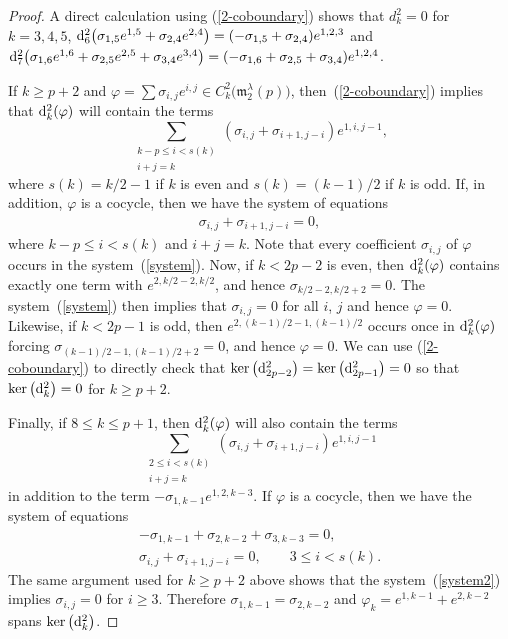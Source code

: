 \documentclass[10pt,a4paper]{amsart}
\def\phi{\varphi}
\def\m{\mathfrak m}
\numberwithin{equation}{section}
\begin{document}
\begin{proof} A direct calculation using (\ref{2-coboundary}) shows that $d^2_k=0$ for $k=3,4,5$, ${\rm d}^2_6\big(\sigma_{1,5}e^{1,5} +\sigma_{2,4}e^{2,4}\big)=(-\sigma_{1,5}+\sigma_{2,4})e^{1,2,3}$ and ${\rm d}^2_7\big(\sigma_{1,6}e^{1,6} +\sigma_{2,5}e^{2,5}+\sigma_{3,4}e^{3,4}\big) =(-\sigma_{1,6} +\sigma_{2,5} +\sigma_{3,4})e^{1,2,4}$.

If $k\ge p+2$ and $\phi=\sum \sigma_{i,j} e^{i,j}\in C^2_k\big(\m_2^\lambda(p)\big)$, then~(\ref{2-coboundary}) implies that ${\rm d}^2_k(\phi)$ will contain the
 terms
 \[\sum_{\substack{k-p\le i< s(k)\\ i+j=k}} (\sigma_{i,j}+\sigma_{i+1,j-i})e^{1,i,j-1},\] where $s(k)=k/2-1$
 if $k$ is even and $s(k)=(k-1)/2$ if $k$ is odd. If, in addition, $\phi$ is a cocycle, then we have the system of equations
 \begin{gather} \label{system}
 \sigma_{i,j}+\sigma_{i+1,j-i} = 0,
 \end{gather}
where $k-p\le i< s(k)$ and $i+j=k$. Note that every coefficient $\sigma_{i,j}$ of $\phi$ occurs in the system~(\ref{system}). Now, if $k<2p-2$ is even, then ${\rm d}^2_k(\phi)$ contains exactly one term with $e^{2,k/2-2,k/2}$, and hence $\sigma_{k/2-2,k/2+2}=0$. The system~(\ref{system}) then implies that $\sigma_{i,j}=0$ for all $i$, $j$ and hence $\phi=0$. Likewise, if $k<2p-1$ is odd, then $e^{2,(k-1)/2-1,(k-1)/2}$ occurs once in ${\rm d}^2_k(\phi)$ forcing $\sigma_{(k-1)/2-1,(k-1)/2+2}=0$, and hence $\phi=0$. We can use (\ref{2-coboundary}) to directly check that $\ker \big({\rm d}^2_{2p-2}\big)=\ker \big({\rm d}^2_{2p-1}\big)=0$ so that $\ker \big({\rm d}^2_k\big)=0$ for
 $k\ge p+2$.

Finally, if $8\le k\le p+1$, then ${\rm d}^2_k(\phi)$ will also contain the terms
 \[\sum_{\substack{2\le i< s(k)\\ i+j=k}}
 (\sigma_{i,j}+\sigma_{i+1,j-i})e^{1,i,j-1}\] in addition to the term $-\sigma_{1,k-1}e^{1,2,k-3}$. If $\phi$ is a cocycle, then we
 have the system of equations
 \begin{gather}
 -\sigma_{1,k-1}+\sigma_{2,k-2}+\sigma_{3,k-3} =0,\nonumber\\
 \sigma_{i,j}+\sigma_{i+1,j-i} = 0, \qquad 3\le i < s(k).\label{system2}
 \end{gather}
 The same argument used for $k\ge p+2$ above shows that the system~(\ref{system2}) implies $\sigma_{i,j}=0$ for $i\ge 3$. Therefore $\sigma_{1,k-1}=\sigma_{2,k-2}$ and $\phi_k=e^{1,k-1}+e^{2,k-2}$ spans $\ker \big({\rm d}^2_k\big)$.
\end{proof}
\end{document}

